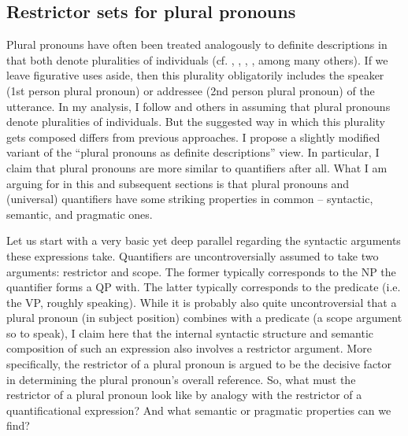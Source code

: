 \documentclass[output=paper,colorlinks,citecolor=brown]{langscibook}
\begin{document}
\subsection{Restrictor sets for plural pronouns}\label{sec:general}
Plural pronouns have often been treated analogously to definite descriptions in that both denote pluralities of individuals (cf. \cite{but:Link1983}, \cite{Nunberg1993}, \cite{but:Elbourne2008}, \cite{Buring2011}, among many others). If we leave figurative uses aside, then this plurality obligatorily includes the speaker (1st person plural pronoun) or addressee (2nd person plural pronoun) of the utterance. In my analysis, I follow \citet{but:Link1983} and others in assuming that plural pronouns denote pluralities of individuals. But the suggested way in which this plurality gets composed differs from previous approaches. I propose a slightly modified variant of the ``plural pronouns as definite descriptions'' view. In particular, I claim that plural pronouns are more similar to quantifiers after all. What I am arguing for in this and subsequent sections is that plural pronouns and (universal) quantifiers have some striking properties in common -- syntactic, semantic, and pragmatic ones.


Let us start with a very basic yet deep parallel regarding the syntactic arguments these expressions take. Quantifiers are uncontroversially assumed to take two arguments: restrictor and scope. The former typically corresponds to the NP the quantifier forms a QP with. The latter typically corresponds to the predicate (i.e. the VP, roughly speaking). While it is probably also quite uncontroversial that a plural pronoun (in subject position) combines with a predicate (a scope argument so to speak), I claim here that the internal syntactic structure and semantic composition of such an expression also involves a restrictor argument. More specifically, the restrictor of a plural pronoun is argued to be the decisive factor in determining the plural pronoun's overall reference. So, what must the restrictor of a plural pronoun look like by analogy with the restrictor of a quantificational expression? And what semantic or pragmatic properties can we find?
\end{document}
